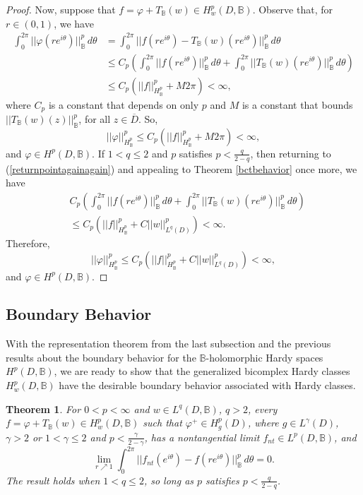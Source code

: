 \documentclass[suppldata]{interact}
\theoremstyle{plain}%
\newtheorem{theorem}{Theorem}[section]
\theoremstyle{definition}
\theoremstyle{remark}
\newcommand{\bc}{\mathbb{B}}
\newcommand{\hwp}{H^p_{w}(D,\bc)}
\begin{document}
\begin{proof}
Now, suppose that $f = \varphi + T_\bc(w) \in H^p_{w}(D,\bc)$. Observe that, for $r \in (0,1)$, we have
\begin{align}
    \int_0^{2\pi} ||\varphi(re^{i\theta})||_\bc^p \,d\theta 
    &= \int_0^{2\pi} ||f(re^{i\theta}) - T_\bc(w)(re^{i\theta})||_\bc^p \,d\theta \nonumber \\
    &\leq C_p \left( \int_0^{2\pi} ||f(re^{i\theta})||_{\bc}^p \,d\theta + \int_0^{2\pi} || T_\bc(w)(re^{i\theta})||_\bc^p \,d\theta\right)  \label{returnpointagainagain}\\
    &\leq C_p\left( ||f||_{H^p_\bc}^p + M 2\pi\right)< \infty,\nonumber
\end{align}
where $C_p$ is a constant that depends on only $p$ and $M$ is a constant that bounds $||T_\bc(w)(z)||_\bc^p$, for all $z \in \overline{D}$. So, 
\[
||\varphi||_{H^p_\bc}^p \leq C_p\left( ||f||_{H^p_\bc}^p + M 2\pi\right)< \infty,
\]
and $\varphi \in H^p(D, \bc)$. If $1 < q \leq 2$ and $p$ satisfies $p < \frac{q}{2-q}$, then returning to (\ref{returnpointagainagain}) and appealing to Theorem \ref{bctbehavior} once more, we have 
\begin{align*}
&C_p \left( \int_0^{2\pi} ||f(re^{i\theta})||_{\bc}^p \,d\theta + \int_0^{2\pi} || T_\bc(w)(re^{i\theta})||_\bc^p \,d\theta\right) \\
&\leq C_p \left( ||f||^p_{H^p_\bc}  + C||w||^p_{L^q(D)}\right)  < \infty.
\end{align*}
Therefore, 
\[
    ||\varphi||^p_{H^p_\bc} \leq C_p \left(  ||f||^p_{H^p_\bc} + C||w||^p_{L^q(D)}\right)  < \infty,
\]
and $\varphi \in H^p(D,\bc)$. 

\end{proof}



\subsection{Boundary Behavior}

With the representation theorem from the last subsection and the previous results about the boundary behavior for the $\bc$-holomorphic Hardy spaces $H^p(D,\bc)$, we are ready to show that the generalized bicomplex Hardy classes $H^p_w(D,\bc)$ have the desirable boundary behavior associated with Hardy classes. 

\begin{theorem}\label{Thm: generalbchardybv}
    For $0 < p < \infty$ and $w \in L^q(D,\bc)$, $q>2$, every $f = \varphi + T_\bc(w)\in \hwp$ such that $\varphi^+ \in H^p_{g}(D)$, where $g \in L^\gamma(D)$, $\gamma>2$ or $1 < \gamma \leq 2$ and $p < \frac{\gamma}{2-\gamma}$, has a nontangential limit $f_{nt} \in L^p(D, \bc)$, and 
    \[
        \lim_{r \nearrow 1} \int_0^{2\pi} ||f_{nt}(e^{i\theta}) - f(re^{i\theta}) ||^p_{\bc} \, d\theta  = 0. 
    \]  
    The result holds when $1 < q \leq 2$, so long as $p$ satisfies $p < \frac{q}{2-q}$.
\end{theorem}
\end{document}
